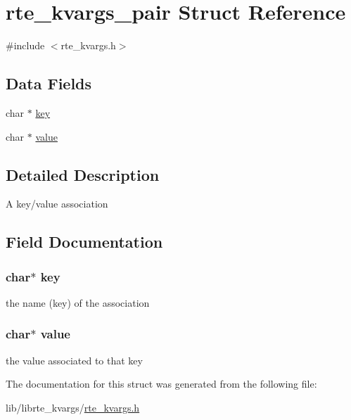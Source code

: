 \hypertarget{structrte__kvargs__pair}{}\section{rte\+\_\+kvargs\+\_\+pair Struct Reference}
\label{structrte__kvargs__pair}


{\ttfamily \#include $<$rte\+\_\+kvargs.\+h$>$}

\subsection*{Data Fields}
\begin{DoxyCompactItemize}
\item 
char $\ast$ \hyperlink{structrte__kvargs__pair_a5892a9181e6a332f84d27aecd41dcd12}{key}
\item 
char $\ast$ \hyperlink{structrte__kvargs__pair_a4e9aec275e566b978a3ccb4e043d8c61}{value}
\end{DoxyCompactItemize}


\subsection{Detailed Description}
A key/value association 

\subsection{Field Documentation}
\hypertarget{structrte__kvargs__pair_a5892a9181e6a332f84d27aecd41dcd12}{}
\subsubsection[{key}]{\setlength{\rightskip}{0pt plus 5cm}char$\ast$ key}\label{structrte__kvargs__pair_a5892a9181e6a332f84d27aecd41dcd12}
the name (key) of the association \hypertarget{structrte__kvargs__pair_a4e9aec275e566b978a3ccb4e043d8c61}{}
\subsubsection[{value}]{\setlength{\rightskip}{0pt plus 5cm}char$\ast$ value}\label{structrte__kvargs__pair_a4e9aec275e566b978a3ccb4e043d8c61}
the value associated to that key 

The documentation for this struct was generated from the following file\+:\begin{DoxyCompactItemize}
\item 
lib/librte\+\_\+kvargs/\hyperlink{rte__kvargs_8h}{rte\+\_\+kvargs.\+h}\end{DoxyCompactItemize}
